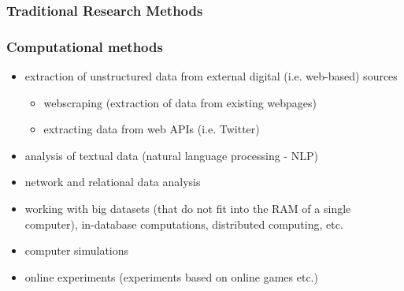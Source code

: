 \documentclass{beamer}
\begin{document}
\begin{frame}
    \frametitle{Traditional Research Methods}
\end{frame}

\begin{frame}
    \frametitle{Computational methods}
    \begin{itemize}
        \item<1> extraction of unstructured data from external digital (i.e. web-based) sources
        \begin{itemize}
            \item<1> webscraping (extraction of data from existing webpages)
            \item<1> extracting data from web APIs (i.e. Twitter)
        \end{itemize}
        \item<1> analysis of textual data (natural language processing - NLP)
        \item<1> network and relational data analysis
        \item<1> working with big datasets (that do not fit into the RAM of a single computer), in-database computations, distributed computing, etc.
        \item<1> computer simulations
        \item<1> online experiments (experiments based on online games etc.)
    \end{itemize}
\end{frame}
\end{document}
